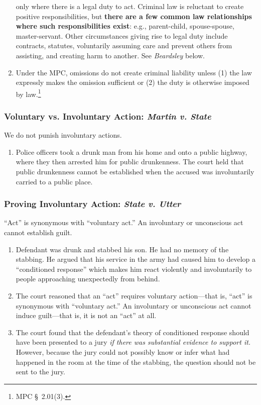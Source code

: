 \begin{enumerate}
    only where there is a legal duty to act. Criminal law is reluctant to 
    create positive responsibilities, but \textbf{there are a few common law 
    relationships where such responsibilities exist}: e.g., parent-child, 
    spouse-spouse, master-servant.  Other circumstances giving rise to legal 
    duty include contracts, statutes, voluntarily assuming care and prevent 
    others from assisting, and creating harm to another. See \emph{Beardsley} 
    below.
    \item Under the MPC, omissions do not create criminal liability unless (1) 
    the law expressly makes the omission sufficient or (2) the duty is 
    otherwise imposed by law.\footnote{MPC \S\ 2.01(3).}
\end{enumerate}

\subsubsection{Voluntary vs. Involuntary Action: \emph{Martin v. State}}

We do not punish involuntary actions.

\begin{enumerate}
    \item Police officers took a drunk man from his home and onto a public 
    highway, where they then arrested him for public drunkenness. The court 
    held that public drunkenness cannot be established when the accused was 
    involuntarily carried to a public place.
\end{enumerate}

\subsubsection{Proving Involuntary Action: \emph{State v. Utter}}

``Act'' is synonymous with ``voluntary act.'' An involuntary or unconscious 
act cannot establish guilt.

\begin{enumerate}
    \item Defendant was drunk and stabbed his son. He had no memory of the 
    stabbing. He argued that his service in the army had caused him to develop 
    a ``conditioned response'' which makes him react violently and 
    involuntarily to people approaching unexpectedly from behind.
    \item The court reasoned that an ``act'' requires voluntary action---that 
    is, ``act'' is synonymous with ``voluntary act.'' An involuntary or 
    unconscious act cannot induce guilt---that is, it is not an ``act'' at 
    all.
    \item The court found that the defendant's theory of conditioned response 
    should have been presented to a jury \emph{if there was substantial 
    evidence to support it.} However, because the jury could not possibly know 
    or infer what had happened in the room at the time of the stabbing, the 
    question should not be sent to the jury.
\end{enumerate}

